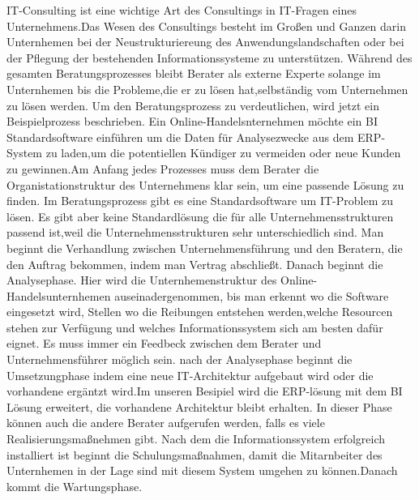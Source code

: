 IT-Consulting ist eine wichtige Art des Consultings in IT-Fragen eines Unternehmens.Das Wesen des Consultings besteht im Großen und Ganzen darin Unternhemen bei der Neustrukturiereung des Anwendungslandschaften oder bei der Pflegung der bestehenden Informationssysteme zu unterstützen. Während des gesamten Beratungsprozesses bleibt Berater als externe Experte solange im Unternhemen bis die Probleme,die er zu lösen hat,selbständig vom Unternehmen zu lösen werden.
Um den Beratungsprozess zu verdeutlichen, wird jetzt ein Beispielprozess beschrieben. Ein Online-Handelsnternehmen möchte ein BI Standardsoftware einführen um die Daten für Analysezwecke aus dem ERP-System zu laden,um die potentiellen Kündiger zu vermeiden oder neue Kunden zu gewinnen.Am Anfang jedes Prozesses muss dem Berater die Organistationstruktur des Unternehmens klar sein, um eine passende Lösung zu finden. Im Beratungsprozess gibt es eine Standardsoftware um IT-Problem zu lösen. Es gibt aber keine Standardlösung die für alle Unternehmensstrukturen passend ist,weil die Unternehmensstrukturen sehr unterschiedlich sind. Man beginnt die Verhandlung zwischen Unternehmensführung und den Beratern, die den Auftrag bekommen, indem man Vertrag abschließt. Danach beginnt die Analysephase. Hier wird die Unternhemenstruktur des Online-Handelsunternhemen auseinadergenommen, bis man erkennt wo die Software eingesetzt wird, Stellen wo die Reibungen entstehen werden,welche Resourcen stehen zur Verfügung und welches Informationssystem sich am besten dafür eignet.
Es muss immer ein Feedbeck zwischen dem Berater und Unternehmensführer möglich sein.
nach der Analysephase beginnt die Umsetzungphase indem eine neue IT-Architektur aufgebaut wird oder die vorhandene ergäntzt wird.Im unseren Besipiel wird die ERP-lösung mit dem BI Lösung erweitert, die vorhandene Architektur bleibt erhalten. In dieser Phase können auch die andere Berater aufgerufen werden, falls es viele Realisierungsmaßnehmen gibt.
Nach dem die Informationssystem erfolgreich installiert ist beginnt die Schulungsmaßnahmen, damit die Mitarnbeiter des Unternhemen in der Lage sind mit diesem System umgehen zu können.Danach kommt die Wartungsphase.
